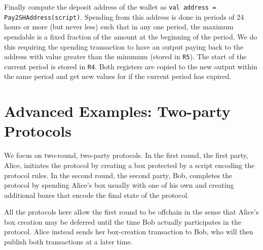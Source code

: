 \documentclass[11pt]{article}
\begin{document}
Finally compute the deposit address of the wallet as \texttt{val address = Pay2SHAddress(script)}. %
Spending from this address is done in periods of 24 hours or more (but never less) such that in any one period, the maximum spendable is a fixed fraction of the amount at the beginning of the period. We do this requiring the spending transaction to have an output paying back to the address with value greater than the minumum (stored in \texttt{R5}). The start of the current period is stored in \texttt{R4}. Both registers are copied to the new output within the same period and get new values for if the current period has expired.


%
%


\section{Advanced Examples: Two-party Protocols}

We focus on two-round, two-party protocols. %
In the first round, the first party, Alice, initiates the protocol by creating a box  protected by a script encoding the protocol rules. In the second round, the second party, Bob, completes the protocol by spending Alice's box usually with one of his own and creating additional boxes that encode the final state of the protocol. 

All the protocols here allow the first round to be offchain in the sense that Alice's box creation may be deferred until the time Bob actually participates in the protocol. Alice instead sends her box-creation transaction to Bob, who will then publish both transactions at a later time. 
\end{document}
